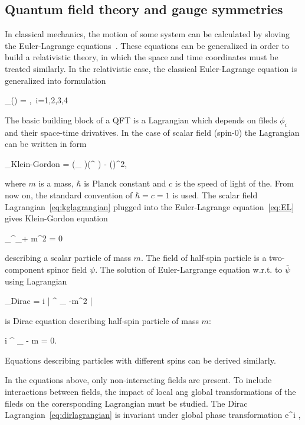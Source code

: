 \subsection{Quantum field theory and gauge symmetries}

In classical mechanics, the motion of some system can be calculated by sloving the Euler-Lagrange equations~\cite{9783527411887}. These equations can be generalized in order to build a relativistic theory, in which the space and time coordinates must be treated similarly. In the relativistic case, the classical Euler-Lagrange equation is generalized into formulation

{
 \partial_{\mu}() = ,~i=1,2,3,4
}


The basic building block of a QFT is a Lagrangian which depends on fileds $\phi_{i}$ and  their space-time drivatives. In the case of scalar field (spin-0) the Lagrangian can be written in form 

{
 _{Klein-Gordon} = (\partial_{\mu} \phi)(\partial^{\mu} \phi) -  ()^{2},
}

where $m$ is a mass, $\hbar$ is Planck constant and $c$ is the speed of light of the. From now on, the standard convention of $\hbar = c = 1$ is used. The scalar field Lagrangian~\ref{eq:kglagrangian} plugged into the Euler-Lagrange equation~\ref{eq:EL} gives Klein-Gordon equation

{
 \partial_{\mu}\partial^{\mu}_\phi + m^{2} \phi = 0
}

describing a scalar particle of mass $m$. The field of half-spin particle is a two-component spinor field $\psi$. The solution of Euler-Largrange equation w.r.t. to $\bar{\psi}$ using Lagrangian


{
 _{Dirac} = i \bar{\psi} \gamma^{\mu} \partial_{\mu} \psi -m^{2} \bar{\psi} \psi
}

is Dirac equation describing half-spin particle of mass $m$:

{
  i \gamma^{\mu} \partial_{\mu} \psi - m \psi = 0.
}

Equations describing  particles with different spins can be derived similarly.

In the equations above, only non-interacting fields are present. To include interactions between fields, the impact of local ang global transformations of the fileds on the corersponding Lagrangian must be studied.  The Dirac Lagrangian~\ref{eq:dirlagrangian} is invariant under global phase transformation
{
\psi \to e^{i\theta} \psi, 
}

